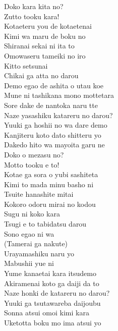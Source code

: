 \def\songtitle{SKY JOURNEY}
\def\songcomment{}
\def\songlyrics{Aki Hata}
\def\songwriter{Hirotaka Hayakawa}
\def\songarrange{Hirotaka Hayakawa}
   
\ifdefined\COMPLETE
\else
	
	
\fi
\thispagestyle{song}

\begin{multicols}{2}
Doko kara kita no?\\
Zutto tooku kara!\\
Kotaeteru you de kotaetenai\\
Kimi wa maru de boku no\\
Shiranai sekai ni ita to\\
Omowaseru tameiki no iro\\

Kitto setsunai\\
Chikai ga atta no darou\\
Demo egao de ashita o utau koe\\

Mune ni tashikana mono mottetara\\
Sore dake de nantoka naru tte \\
Naze yasashiku katareru no darou?\\
Yuuki ga hoshii no wa dare demo\\
Kanjiteru koto dato shitteru yo\\
Dakedo hito wa mayoita garu ne\\

Doko o mezasu no?\\
Motto tooku e to!\\
Kotae ga sora o yubi sashiteta\\
Kimi to mada minu basho ni\\
Tsuite hanashite mitai\\
Kokoro odoru mirai no kodou\\

Sugu ni koko kara\\
Tsugi e to tabidatsu darou\\
Sono egao ni wa\\
(Tamerai ga nakute)\\
Urayamashiku naru yo\\
Mabushii yue ni\\

Yume kanaetai kara itsudemo\\
Akiramenai koto ga daiji da to\\
Naze honki de katareru no darou?\\
Yuuki ga tsutawareba daijoubu\\
Sonna atsui omoi kimi kara\\
Uketotta boku mo ima atsui yo\\


\end{multicols}
